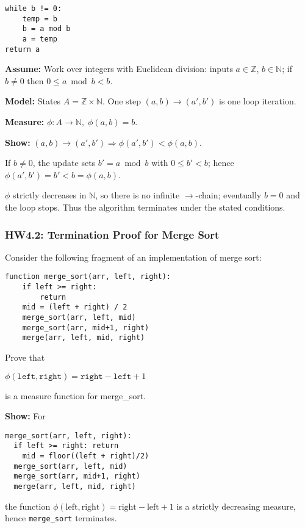 \documentclass{article}
\theoremstyle{theorem}
\theoremstyle{definition}
\theoremstyle{remark}
\begin{document}
\begin{verbatim}
while b != 0:
    temp = b
    b = a mod b
    a = temp
return a
\end{verbatim}

\textbf{Assume:} Work over integers with Euclidean division: inputs $a\in\mathbb Z$, $b\in\mathbb N$; if $b\neq 0$ then $0\le a\bmod b<b$.

\textbf{Model:} States $A=\mathbb Z\times\mathbb N$. One step $(a,b)\to(a',b')$ is one loop iteration.

\textbf{Measure:} $\phi:A\to\mathbb N,\;\phi(a,b)=b$.

\textbf{Show:} $(a,b)\to(a',b') \Rightarrow \phi(a',b')<\phi(a,b)$.

If $b\neq 0$, the update sets $b'=a\bmod b$ with $0\le b'<b$; hence $\phi(a',b')=b'<b=\phi(a,b)$.

$\phi$ strictly decreases in $\mathbb N$, so there is no infinite $\to$-chain; eventually $b=0$ and the loop stops. Thus the algorithm terminates under the stated conditions.

\subsubsection{HW4.2: Termination Proof for Merge Sort}

Consider the following fragment of an implementation of merge sort:

\begin{verbatim}
function merge_sort(arr, left, right):
    if left >= right:
        return
    mid = (left + right) / 2
    merge_sort(arr, left, mid)
    merge_sort(arr, mid+1, right)
    merge(arr, left, mid, right)
\end{verbatim}

Prove that 

$\phi(\texttt{left}, \texttt{right}) = \texttt{right} - \texttt{left} + 1$ 

is a measure function for merge\_sort.

\textbf{Show:} For

\begin{verbatim}
merge_sort(arr, left, right):
  if left >= right: return
    mid = floor((left + right)/2)
  merge_sort(arr, left, mid)
  merge_sort(arr, mid+1, right)
  merge(arr, left, mid, right)
\end{verbatim}

the function $\phi(\text{left},\text{right})=\text{right}-\text{left}+1$ is a strictly decreasing measure, hence \texttt{merge\_sort} terminates.
\end{document}

